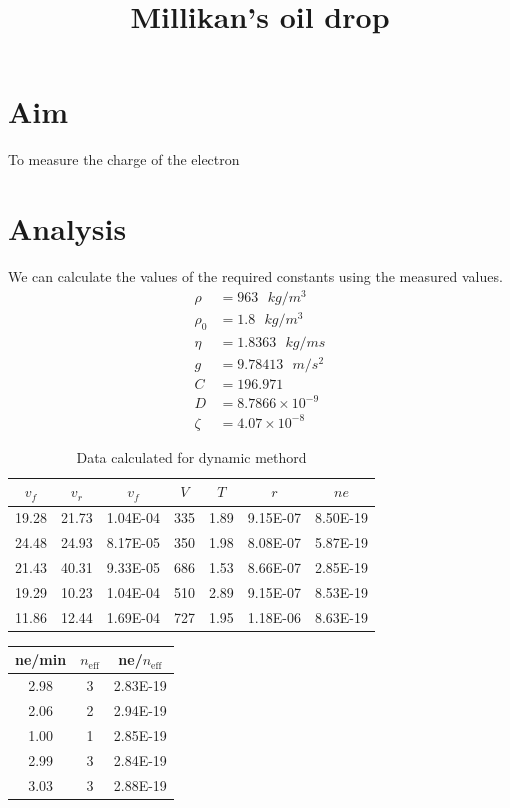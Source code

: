 \documentclass[12pt]{article}
\begin{document}
\author{}
\date{}
\title{Millikan's oil drop}
\maketitle
\section*{Aim}
To measure the charge of the electron 
\section*{Analysis}
We can calculate the values of the required constants using the measured values.
\begin{align*}
    \rho &=  963\text{ } kg/m^3 \\
    \rho_0 &= 1.8\text{ }kg/m^3 \\
    \eta &= 1.8363\text{ }kg/ms \\
    g &= 9.78413\text{ } m/s^2 \\
    C &= 196.971 \\
    D &= 8.7866 \times 10^{-9} \\
    \zeta &= 4.07 \times 10^{-8}
\end{align*}
\begin{table}[H]
    \centering
    \begin{tabular}{|c|c|c|c|c|c|c|}
    \hline
        \textbf{$v_f$} & \textbf{$v_r$} & \textbf{$v_f$} & \textbf{$V$} & \textbf{$T$} & \textbf{$r$} & \textbf{$ne$} \\ \hline
        19.28 & 21.73 & 1.04E-04 & 335 & 1.89 & 9.15E-07 & 8.50E-19 \\ \hline
        24.48 & 24.93 & 8.17E-05 & 350 & 1.98 & 8.08E-07 & 5.87E-19 \\ \hline
        21.43 & 40.31 & 9.33E-05 & 686 & 1.53 & 8.66E-07 & 2.85E-19 \\ \hline
        19.29 & 10.23 & 1.04E-04 & 510 & 2.89 & 9.15E-07 & 8.53E-19 \\ \hline
        11.86 & 12.44 & 1.69E-04 & 727 & 1.95 & 1.18E-06 & 8.63E-19 \\ \hline
    \end{tabular}
    \caption{Data calculated for dynamic methord}
\end{table}

\begin{table}[H]
    \centering
    \begin{tabular}{|c|c|c|}
    \hline
        {ne/min} & {$n_{\text{eff}}$} & {ne/$n_{\text{eff}}$} \\ \hline
        2.98 & 3 & 2.83E-19 \\ \hline
        2.06 & 2 & 2.94E-19 \\ \hline
        1.00 & 1 & 2.85E-19 \\ \hline
        2.99 & 3 & 2.84E-19 \\ \hline
        3.03 & 3 & 2.88E-19 \\ \hline
    \end{tabular}
\end{table}
\end{document}
